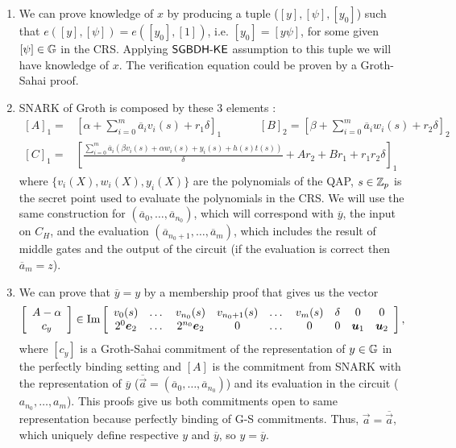 \begin{enumerate}
	\item We can prove knowledge of $x$ by producing a tuple ($[y], [\psi], [y_0]$) such that $e([y],[\psi])=e([y_0],[1])$, i.e. $[y_0]=[y \psi]$, for some given $[\psi] \in \mathbb{G}$ in the CRS. Applying $\mathsf{SGBDH\mbox{-}KE}$ assumption to this tuple we will have knowledge of $x$. The verification equation could be proven by a Groth-Sahai proof.
	\item SNARK of Groth is composed by these 3 elements \cite{EC:Groth16}:
	\[\begin{split}
	[A]_1 = &\left[\alpha + \sum_{i=0}^m \overline{a}_i v_i(s) + r_1 \delta\right]_1  \hspace{40pt} [B]_2 = \left[\beta + \sum_{i=0}^m \overline{a}_i w_i(s) + r_2 \delta\right]_2\\
	[C]_1 = &\left[\frac{\sum_{i=0}^m \overline{a}_i\left(\beta v_i(s)+\alpha w_i(s)+y_i(s)+h(s)t(s)\right)}{\delta}+Ar_2+B r_1+ r_1r_2\delta \right]_1
	\end{split}\]
	where $\{v_i(X),w_i(X),y_i(X)\}$ are the polynomials of the QAP, $s\in \mathbb{Z}_p$ is the secret point used to evaluate the polynomials in the CRS.
	We will use the same construction for $(\overline{a}_0,\dots,\overline{a}_{n_0})$, which will correspond with $\overline{y}$, the input on $C_H$, and the evaluation $(\overline{a}_{n_0+1},\dots,\overline{a}_m)$, which includes the result of middle gates and the output of the circuit (if the evaluation is correct then $\overline{a}_m=z$).
	\item We can prove that $\overline{y}=y$ by a membership proof that gives us the vector
	$$\left[\begin{array}{c}
	A - \alpha\\
	c_y\\
	\end{array}\right] \in \text{Im}\left[\begin{array}{c c c c c c c c c}
	v_0(s) & \dots & v_{n_0}(s) & v_{n_0+1}(s) & \dots & v_{m}(s) &\delta & 0 & 0 \\
	2^0\vec{e}_2 & \dots & 2^{n_0} \vec{e}_2 & 0 &\dots &0 & 0 & \vec{u}_1 & \vec{u}_2\\
	\end{array}\right],$$
	where $[c_y]$ is a Groth-Sahai commitment of the representation of $y \in \mathbb{G}$ in the perfectly binding setting and $[A]$ is the commitment from SNARK with the representation of $\overline{y}$ ($\overline{\vec{a}}=(\overline{a}_0,\dots,\overline{a}_{n_0})$) and its evaluation in the circuit ($a_{n_0},\dots,a_m$). This proofs give us both commitments open to same representation because perfectly binding of G-S commitments. Thus, $\vec{a} = \overline{\vec{a}}$, which uniquely define respective $y$ and $\overline{y}$, so $y=\overline{y}$.
\end{enumerate}


